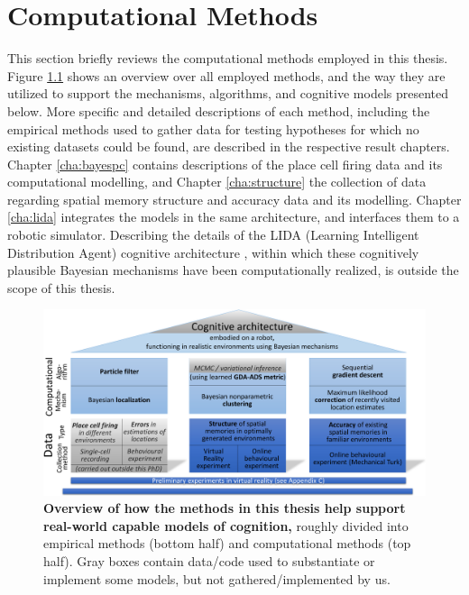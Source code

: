 \chapter{Computational Methods}
\label{cha:methods}

This section briefly reviews the computational methods employed in this thesis. Figure \ref{fig:methods} shows an overview over all employed methods, and the way they are utilized to support the mechanisms, algorithms, and cognitive models presented below. More specific and detailed descriptions of each method, including the empirical methods used to gather data for testing hypotheses for which no existing datasets could be found, are described in the respective result chapters. Chapter \ref{cha:bayespc} contains descriptions of the place cell firing data and its computational modelling, and Chapter \ref{cha:structure} the collection of data regarding spatial memory structure and accuracy data and its modelling. Chapter \ref{cha:lida} integrates the models in the same architecture, and interfaces them to a robotic simulator. 
Describing the details of the LIDA (Learning Intelligent Distribution Agent) cognitive architecture \citep{franklin2013lida}, within which these cognitively plausible Bayesian mechanisms have been computationally realized, is outside the scope of this thesis.

\begin{figure}[h]
	\centering
	\includegraphics[width=\textwidth]{img/methodsfigure2}
	\caption[Overview of how the methods in this thesis help support real-world capable models of cognition]{\textbf{Overview of how the methods in this thesis help support real-world capable models of cognition,} roughly divided into empirical methods (bottom half) and computational methods (top half). Gray boxes contain data/code used to substantiate or implement some models, but not gathered/implemented by us.} 
	\label{fig:methods}
\end{figure}

